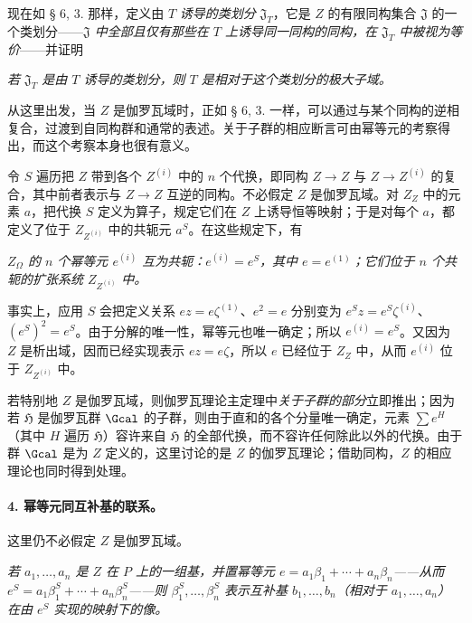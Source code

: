 现在如 § 6, 3. 那样，定义由 \(T\) \emph{诱导的类划分} \(\mathfrak J_T\)，它是 \(Z\) 的有限同构集合 \(\mathfrak J\) 的一个类划分——\emph{\(\mathfrak J\) 中全部且仅有那些在 \(T\) 上诱导同一同构的同构，在 \(\mathfrak J_T\) 中被视为等价}——并证明

\noindent\textbf{} \emph{若 \(\mathfrak J_T\) 是由 \(T\) 诱导的类划分，则 \(T\) 是相对于这个类划分的极大子域。}

从这里出发，当 \(Z\) 是伽罗瓦域时，正如 § 6, 3. 一样，可以通过与某个同构的逆相复合，过渡到自同构群和通常的表述。关于子群的相应断言可由幂等元的考察得出，而这个考察本身也很有意义。

\medskip
\noindent\textbf{}\quad 令 \(S\) 遍历把 \(Z\) 带到各个 \(Z^{(i)}\) 中的 \(n\) 个代换，即同构 \(Z\to Z\) 与 \(Z\to Z^{(i)}\) 的复合，其中前者表示与 \(Z\to Z\) 互逆的同构。不必假定 \(Z\) 是伽罗瓦域。对 \(Z_Z\) 中的元素 \(a\)，把代换 \(S\) 定义为算子，规定它们在 \(Z\) 上诱导恒等映射；于是对每个 \(a\)，都定义了位于 \(Z_{Z^{(i)}}\) 中的共轭元 \(a^S\)。在这些规定下，有

\noindent\textbf{} \emph{\(Z_\Omega\) 的 \(n\) 个幂等元 \(e^{(i)}\) 互为共轭：\(e^{(i)}=e^S\)，其中 \(e=e^{(1)}\)；它们位于 \(n\) 个共轭的扩张系统 \(Z_{Z^{(i)}}\) 中。}

事实上，应用 \(S\) 会把定义关系 \(ez=e\zeta^{(1)}\)、\(e^2=e\) 分别变为 \(e^Sz=e^S\zeta^{(i)}\)、\((e^S)^2=e^S\)。由于分解的唯一性，幂等元也唯一确定；所以 \(e^{(i)}=e^S\)。又因为 \(Z\) 是析出域，因而已经实现表示 \(ez=e\zeta\)，所以 \(e\) 已经位于 \(Z_Z\) 中，从而 \(e^{(i)}\) 位于 \(Z_{Z^{(i)}}\) 中。

若特别地 \(Z\) 是伽罗瓦域，则伽罗瓦理论主定理中\emph{关于子群的部分}立即推出；因为若 \(\mathfrak H\) 是伽罗瓦群 \(\Gcal\) 的子群，则由于直和的各个分量唯一确定，元素 \(\sum e^H\)（其中 \(H\) 遍历 \(\mathfrak H\)）容许来自 \(\mathfrak H\) 的全部代换，而不容许任何除此以外的代换。由于群 \(\Gcal\) 是为 \(Z\) 定义的，这里讨论的是 \(Z\) 的伽罗瓦理论；借助同构，\(Z\) 的相应理论也同时得到处理。

\paragraph{4. 幂等元同互补基的联系。}
这里仍不必假定 \(Z\) 是伽罗瓦域。

\noindent\textbf{} \emph{若 \(a_1,\ldots,a_n\) 是 \(Z\) 在 \(P\) 上的一组基，并置幂等元 \(e=a_1\beta_1+\cdots+a_n\beta_n\)——从而 \(e^S=a_1\beta_1^S+\cdots+a_n\beta_n^S\)——则 \(\beta_1^S,\ldots,\beta_n^S\) 表示互补基 \(b_1,\ldots,b_n\)（相对于 \(a_1,\ldots,a_n\)）在由 \(e^S\) 实现的映射下的像。}

